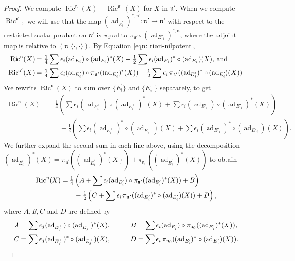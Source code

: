 \documentclass[12pt]{amsart}
\newcommand{\frakn}{\ensuremath{\mathfrak{n}} }
\newcommand\n{{\mathfrak{n}}}
\newcommand\ip{{\langle\cdot {,} \cdot\rangle}}
\newcommand\ad{\operatorname{ad}}
\newcommand{\Ric}{\operatorname{Ric}}
\theoremstyle{plain}
\theoremstyle{definition}
\theoremstyle{remark}
\numberwithin{equation}{section}
\numberwithin{theorem}{section}
\begin{document}
\begin{proof} We  compute  $\Ric^\n (X) - \Ric^{\n'} (X)$ for $X$ in $\n'.$
When we compute  $\Ric^{\n'},$ we will use that the  map $(\ad_{E_i^\prime})^{\ast, \frakn'}:\frakn' \to \frakn'$ 
 with respect to the restricted scalar product on $\frakn'$ is
equal to $\pi_{\n'} \circ (\ad_{E'_i})^{\ast,\frakn}$, where the adjoint map is relative to $(\frakn,\ip).$
By Equation \eqref{eqn: ricci-nilpotent},
\begin{align} \Ric^{\n} (X) &= \tfrac 14 \sum \epsilon_i  (\ad_{E_i}) \circ (\ad_{E_i})^* (X) - \tfrac 12 \sum \epsilon_i (\ad_{E_i})^* \circ  (\ad_{E_i})  (X), \, \text{and}
\notag \\
 \Ric^{\n'} (X) &= \tfrac 14 \sum \epsilon_i  (\ad_{E'_i}) \circ
 \pi_{\frakn^\prime} ((\ad_{E'_i})^* (X)) 
 - \tfrac 12 \sum \epsilon_i \, \pi_{\n'}((\ad_{E'_i})^* \circ  (\ad_{E'_i})  (X)). \notag 
\end{align}
We rewrite $ \Ric^{\n} (X)$ to sum over $\{ E_i^\prime\}$ and $\{E_i^\perp\}$ separately, to get
\begin{align*}  \Ric^{\n} (X) &= \tfrac 14 \left(\sum \epsilon_i  (\ad_{E_i^\perp}) \circ (\ad_{E_i^\perp})^* (X) + 
\sum \epsilon_i  (\ad_{E'_i})  \circ (\ad_{E'_i})^* (X) \right)    \\
& \qquad - \tfrac 12\left(\sum\epsilon_i  (\ad_{E_i^\perp})^* \circ  (\ad_{E_i^\perp})  (X) + 
\sum \epsilon_i  (\ad_{E'_i})^* \circ  (\ad_{E'_i})  (X)  \right). 
\end{align*}
We further expand  the second sum in each line above, using the decomposition
$(\ad_{E_i^\prime})^\ast(X) = \pi_{\frakn^\prime}
( (\ad_{E_i^\prime})^\ast (X) ) + 
\pi_{\frakn_0} ( (\ad_{E_i^\prime})^\ast(X) )$
to obtain
\begin{align}  \Ric^{\n} (X) 
&= \tfrac 14\left(A + \sum \epsilon_i  (\ad_{E'_i})  \circ \pi_{\n'}((\ad_{E'_i})^*
  (X)) +    B \right) 
\notag \\
& \qquad - \tfrac 12 \left(C + \sum  \epsilon_i \, \pi_{\n'}((\ad_{E'_i})^* \circ
  (\ad_{E'_i}) (X))  + D \right),\notag \end{align}
where $A, B, C$ and $D$ are defined by 
  \begin{alignat}{2} 
A &= \sum \epsilon_j (\ad_{E_j^\perp}) \circ  (\ad_{E_j^\perp})^* (X),& \qquad  
B &=  \sum \epsilon_i  (\ad_{E'_i}) \circ \pi_{\n_0}((\ad_{E'_i})^* (X)), \notag \\
C &=  \sum\epsilon_j  (\ad_{E_j^\perp})^* \circ  (\ad_{E_j^\perp})  (X),& \qquad
D &= \sum \epsilon_i \, \pi_{\n_0}((\ad_{E'_i})^* \circ (\ad_{E'_i}) (X)). \notag

\end{alignat}
\end{proof}
\end{document}
